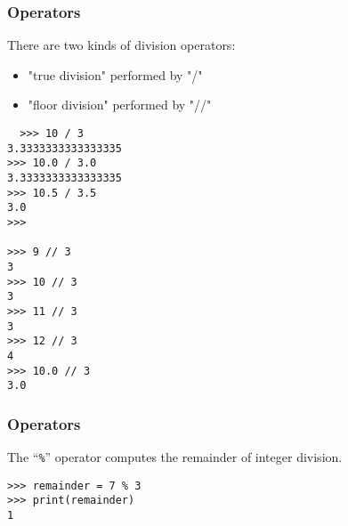 %
%
%


\begin{frame}[fragile]\frametitle{Operators}
There are two kinds of division operators:
\begin{itemize}
\item  "true division" performed by "/"
\item  "floor division" performed by "//"

\end{itemize}

  \begin{lstlisting}
  >>> 10 / 3
3.3333333333333335
>>> 10.0 / 3.0
3.3333333333333335
>>> 10.5 / 3.5
3.0
>>> 

>>> 9 // 3
3
>>> 10 // 3
3
>>> 11 // 3
3
>>> 12 // 3
4
>>> 10.0 // 3
3.0
  \end{lstlisting}

\end{frame}


\begin{frame}[fragile]\frametitle{Operators}

The ``\texttt{\%}'' operator computes the remainder of integer division.
  \begin{lstlisting}
>>> remainder = 7 % 3
>>> print(remainder)
1
  \end{lstlisting}

\end{frame}



